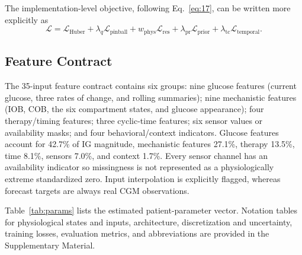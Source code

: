 \documentclass[journal]{IEEEtran}
\begin{document}
The implementation-level objective, following Eq.~\eqref{eq:17}, can be written more explicitly as
\begin{equation}
\mathcal{L} = \mathcal{L}_{\text{Huber}} + \lambda_q \mathcal{L}_{\text{pinball}} + w_{\text{phys}} \mathcal{L}_{\text{res}} + \lambda_{\text{pr}} \mathcal{L}_{\text{prior}} + \lambda_{\text{tc}} \mathcal{L}_{\text{temporal}}.
\label{eq:22}
\end{equation}

\subsection{Feature Contract}

The 35-input feature contract contains six groups: nine glucose features (current glucose, three rates of change, and rolling summaries); nine mechanistic features (IOB, COB, the six compartment states, and glucose appearance); four therapy/timing features; three cyclic-time features; six sensor values or availability masks; and four behavioral/context indicators. Glucose features account for 42.7\% of IG magnitude, mechanistic features 27.1\%, therapy 13.5\%, time 8.1\%, sensors 7.0\%, and context 1.7\%. Every sensor channel has an availability indicator so missingness is not represented as a physiologically extreme standardized zero. Input interpolation is explicitly flagged, whereas forecast targets are always real CGM observations.

Table~\ref{tab:params} lists the estimated patient-parameter vector. Notation tables for physiological states and inputs, architecture, discretization and uncertainty, training losses, evaluation metrics, and abbreviations are provided in the Supplementary Material.
\end{document}
